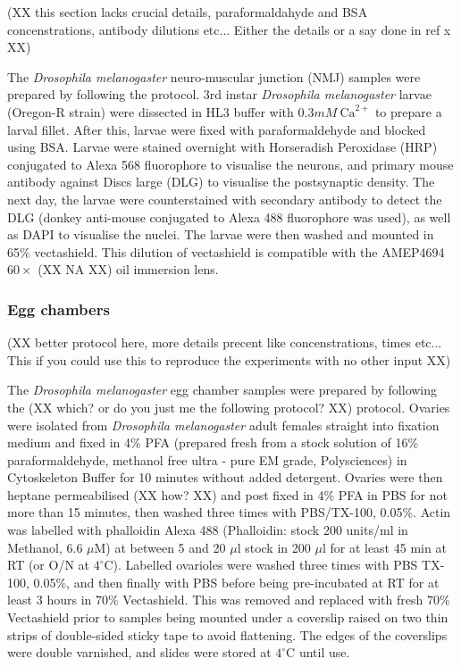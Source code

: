 (XX this section lacks crucial details, paraformaldahyde and BSA
concenstrations, antibody dilutions etc... Either the details or a say
done in ref x XX) 

The \textit{Drosophila melanogaster} neuro-muscular junction (NMJ) 
samples were prepared by following the protocol. 
3rd instar \textit{Drosophila melanogaster} larvae (Oregon-R 
strain) were dissected in HL3 buffer with $0.3mM~\text{Ca}^{2+}$ to 
prepare a larval fillet. After this, larvae were fixed with 
paraformaldehyde and blocked using BSA. Larvae were stained 
overnight with Horseradish Peroxidase (HRP) conjugated to Alexa 568 
fluorophore to visualise the neurons, and primary mouse antibody 
against Discs large (DLG) to visualise the postsynaptic density. 
The next day, the larvae were counterstained with secondary 
antibody to detect the DLG (donkey anti-mouse conjugated to 
Alexa 488 fluorophore was used), as well as DAPI to visualise the 
nuclei. The larvae were then washed and mounted in 65\% 
vectashield\cite{brent2009drosophila}. This dilution of 
vectashield is compatible with the AMEP4694 $60\times$ (XX NA XX) oil 
immersion lens.

\subsubsection{Egg chambers}
\label{subsubsec:Aurox_Egg_chambers_prep}

(XX better protocol here, more details precent like concenstrations,
times etc... This if you could use this to reproduce the experiments
with no other input XX)

The \textit{Drosophila melanogaster} egg chamber samples were 
prepared by following the (XX which? or do you just me the following protocol? XX)  protocol. Ovaries were isolated from 
\textit{Drosophila melanogaster} adult females straight into fixation 
medium and fixed in 4\% PFA (prepared fresh from a stock solution 
of 16\% paraformaldehyde, methanol free ultra - pure EM grade, 
Polysciences) in Cytoskeleton Buffer for 10 minutes without added 
detergent\cite{jia2016automatic,zhang2020nanoscale,leyton2016pfa}. 
Ovaries were then heptane permeabilised (XX how? XX)  and post fixed in 4\% PFA 
in PBS for not more than 15 minutes, then washed three times with 
PBS/TX-100, 0.05\%. Actin was labelled with phalloidin Alexa 488 
(Phalloidin: stock 200 units/ml in Methanol, 6.6 $\mu$M) at between 
5 and 20 $\mu$l stock in 200 $\mu$l for at least 45 min at RT (or 
O/N at $4^{\circ}$C). Labelled ovarioles were washed three times with 
PBS TX-100, 0.05\%, and then finally with PBS before being 
pre-incubated at RT for at least 3 hours in 70\% Vectashield. This 
was removed and replaced with fresh 70\% Vectashield prior to samples 
being mounted under a coverslip raised on two thin strips of 
double-sided sticky tape to avoid flattening\cite{davidson2016localized}.
The edges of the coverslips were double varnished, and slides were stored 
at $4^{\circ}$C until use.

